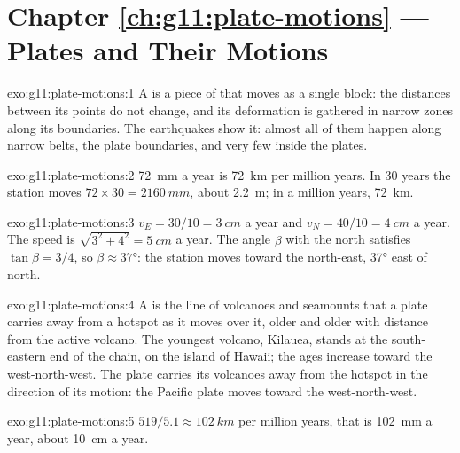 \section*{Chapter \ref{ch:g11:plate-motions} --- Plates and Their Motions}

\begin{solution}{exo:g11:plate-motions:1}
A  is a piece of  that moves as a single block: the
distances between its points do not change, and its deformation is gathered in
narrow zones along its boundaries. The earthquakes show it: almost all of them
happen along narrow belts, the plate boundaries, and very few inside the
plates.
\end{solution}

\begin{solution}{exo:g11:plate-motions:2}
\qty{72}{mm} a year is \qty{72}{km} per million years. In 30 years the station
moves $72 \times 30 = \qty{2160}{mm}$, about \qty{2.2}{m}; in a million years,
\qty{72}{km}.
\end{solution}

\begin{solution}{exo:g11:plate-motions:3}
$v_E = 30/10 = \qty{3}{cm}$ a year and $v_N = 40/10 = \qty{4}{cm}$ a year. The
speed is $\sqrt{3^2 + 4^2} = \qty{5}{cm}$ a year. The angle $\beta$ with the
north satisfies $\tan\beta = 3/4$, so $\beta \approx \ang{37}$: the station
moves toward the north-east, \ang{37} east of north.
\end{solution}

\begin{solution}{exo:g11:plate-motions:4}
A  is the line of volcanoes and seamounts that a plate carries
away from a hotspot as it moves over it, older and older with distance from
the active volcano. The youngest volcano, Kilauea, stands at the
south-eastern end of the chain, on the island of Hawaii; the ages increase
toward the west-north-west. The plate carries its volcanoes away from the
hotspot in the direction of its motion: the Pacific plate moves toward the
west-north-west.
\end{solution}

\begin{solution}{exo:g11:plate-motions:5}
$519/5.1 \approx \qty{102}{km}$ per million years, that is \qty{102}{mm} a
year, about \qty{10}{cm} a year.
\end{solution}

